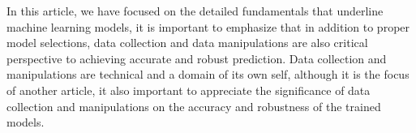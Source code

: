 
\par
In this article, we have focused on the detailed fundamentals that underline machine learning models, it is important to emphasize that in addition to proper model selections, data collection and data manipulations are also critical perspective to achieving accurate and robust prediction. Data collection and manipulations are technical and a domain of its own self, although it is the focus of another article, it also important to appreciate the significance of data collection and manipulations on the accuracy and robustness of the trained models.
\par 
